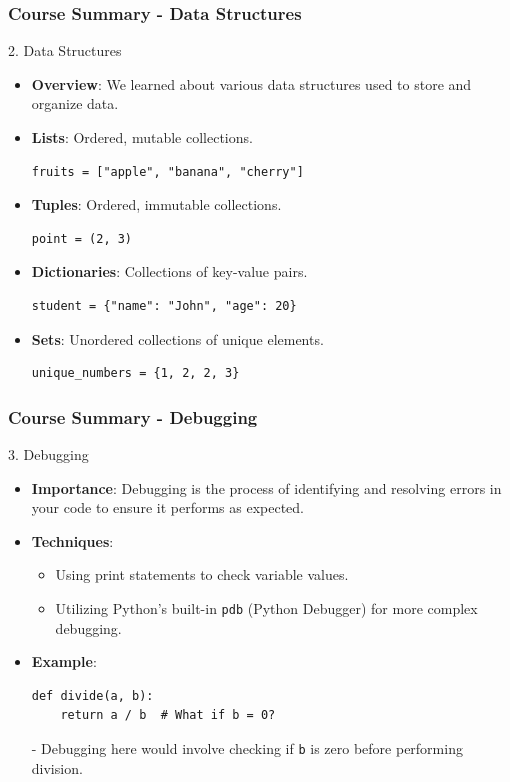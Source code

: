 \documentclass{beamer}
\begin{document}
\begin{frame}[fragile]
    \frametitle{Course Summary - Data Structures}
    \begin{block}{2. Data Structures}
        \begin{itemize}
            \item \textbf{Overview}: We learned about various data structures used to store and organize data.
            \item \textbf{Lists}: Ordered, mutable collections.
            \begin{lstlisting}
fruits = ["apple", "banana", "cherry"]
            \end{lstlisting}
            \item \textbf{Tuples}: Ordered, immutable collections.
            \begin{lstlisting}
point = (2, 3)
            \end{lstlisting}
            \item \textbf{Dictionaries}: Collections of key-value pairs.
            \begin{lstlisting}
student = {"name": "John", "age": 20}
            \end{lstlisting}
            \item \textbf{Sets}: Unordered collections of unique elements.
            \begin{lstlisting}
unique_numbers = {1, 2, 2, 3}
            \end{lstlisting}
        \end{itemize}
    \end{block}
\end{frame}

\begin{frame}[fragile]
    \frametitle{Course Summary - Debugging}
    \begin{block}{3. Debugging}
        \begin{itemize}
            \item \textbf{Importance}: Debugging is the process of identifying and resolving errors in your code to ensure it performs as expected.
            \item \textbf{Techniques}:
            \begin{itemize}
                \item Using print statements to check variable values.
                \item Utilizing Python’s built-in \texttt{pdb} (Python Debugger) for more complex debugging.
            \end{itemize}
            \item \textbf{Example}:
            \begin{lstlisting}
def divide(a, b):
    return a / b  # What if b = 0?
            \end{lstlisting}
            - Debugging here would involve checking if \texttt{b} is zero before performing division.
        \end{itemize}
    \end{block}
\end{frame}
\end{document}
